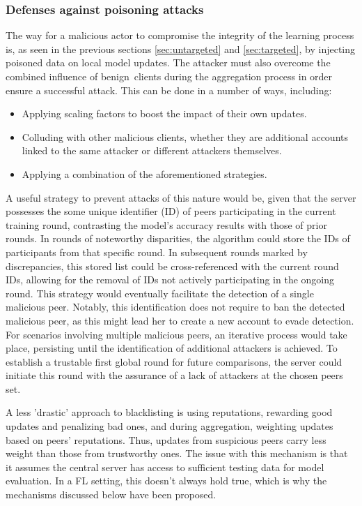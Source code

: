 \subsubsection{Defenses against poisoning attacks}
The way for a malicious actor to compromise the integrity of the learning process is, as seen in the previous sections \ref{sec:untargeted} and \ref{sec:targeted}, by injecting poisoned data on local model updates. The attacker must also overcome the combined influence of benign clients during the aggregation process in order ensure a successful attack. This can be done in a number of ways, including:
\begin{itemize}
        \item Applying scaling factors to boost the impact of their own updates.
        \item Colluding with other malicious clients, whether they are additional accounts linked to the same attacker or different attackers themselves.
        \item Applying a combination of the aforementioned strategies.
\end{itemize}

A useful strategy to prevent attacks of this nature would be, given that the server possesses the some unique identifier (ID) of peers participating in the current training round, contrasting the model's accuracy results with those of prior rounds. In rounds of noteworthy disparities, the algorithm could store the IDs of participants from that specific round. In subsequent rounds marked by discrepancies, this stored list could be cross-referenced with the current round IDs, allowing for the removal of IDs not actively participating in the ongoing round. This strategy would eventually facilitate the detection of a single malicious peer. Notably, this identification does not require to ban the detected malicious peer, as this might lead her to create a new account to evade detection.
For scenarios involving multiple malicious peers, an iterative process would take place, persisting until the identification of additional attackers is achieved. To establish a trustable first global round for future comparisons, the server could initiate this round with the assurance of a lack of attackers at the chosen peers set.


A less 'drastic' approach to blacklisting is using reputations, rewarding good updates and penalizing bad ones, and during aggregation, weighting updates based on peers' reputations. Thus, updates from suspicious peers carry less weight than those from trustworthy ones.
The issue with this mechanism is that it assumes the central server has access to sufficient testing data for model evaluation. In a FL setting, this doesn't always hold true, which is why the mechanisms discussed below have been proposed.



